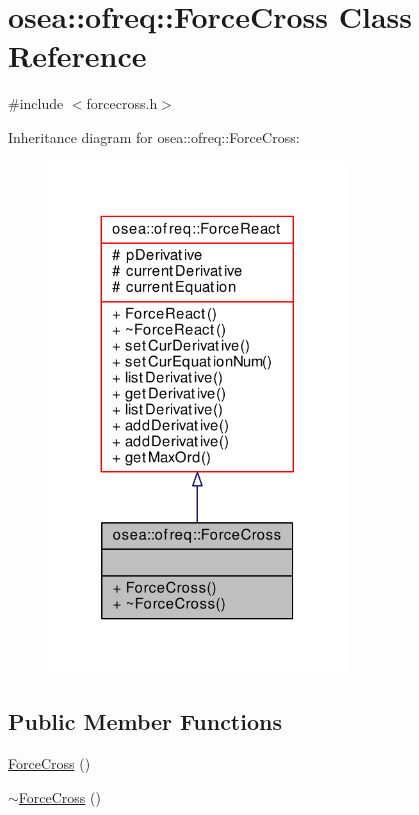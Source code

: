\hypertarget{classosea_1_1ofreq_1_1_force_cross}{\section{osea\-:\-:ofreq\-:\-:Force\-Cross Class Reference}
\label{classosea_1_1ofreq_1_1_force_cross}
}


{\ttfamily \#include $<$forcecross.\-h$>$}



Inheritance diagram for osea\-:\-:ofreq\-:\-:Force\-Cross\-:\nopagebreak
\begin{figure}[H]
\begin{center}
\leavevmode
\includegraphics[width=224pt]{classosea_1_1ofreq_1_1_force_cross__inherit__graph}
\end{center}
\end{figure}
\subsection*{Public Member Functions}
\begin{DoxyCompactItemize}
\item 
\hyperlink{classosea_1_1ofreq_1_1_force_cross_a0dd29488051709ddbb950ee75565c53a}{Force\-Cross} ()
\item 
\hyperlink{classosea_1_1ofreq_1_1_force_cross_ad5fc44b9a9d71823f80467f560cfdecc}{$\sim$\-Force\-Cross} ()
\end{DoxyCompactItemize}
